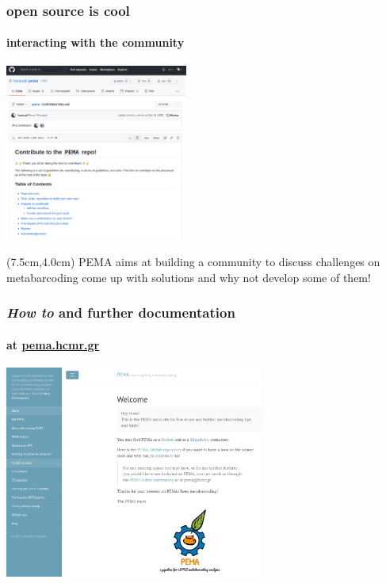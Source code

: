 \documentclass{beamer}
\begin{document}
\begin{frame}
\begin{singlespace}
\begin{textblock*}{5cm}
         \end{textblock*}


      \end{singlespace}
   \end{frame}

   \begin{frame}
   \frametitle{open source is cool}
      \framesubtitle{interacting with the community}

      \includegraphics[width=60mm]{resources/pema_contribution.png}

      \small
      \begin{textblock*}{5cm}(7.5cm,4.0cm) %
         PEMA aims at building a community 
         to discuss challenges on metabarcoding
         come up with solutions and why not 
         develop some of them! 
      \end{textblock*}

   \end{frame}



   \begin{frame}
      \frametitle{\textit{How to} and further documentation}
      \framesubtitle{at \href{http://pema.hcmr.gr}{pema.hcmr.gr}}
      \includegraphics[width=85mm]{resources/pema_site.png}
   \end{frame}
\end{document}
